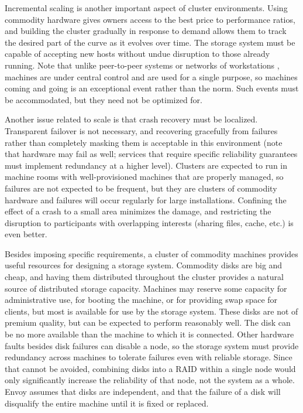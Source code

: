 Incremental scaling is another important aspect of cluster environments. Using commodity hardware gives owners access to the best price to performance ratios, and building the cluster gradually in response to demand allows them to track the desired part of the curve as it evolves over time. The storage system must be capable of accepting new hosts without undue disruption to those already running. Note that unlike peer-to-peer systems \cite{blake} or networks of workstations \cite{anderson95a}, machines are under central control and are used for a single purpose, so machines coming and going is an exceptional event rather than the norm. Such events must be accommodated, but they need not be optimized for.

Another issue related to scale is that crash recovery must be localized. Transparent failover is not necessary, and recovering gracefully from failures rather than completely masking them \cite{baker94} is acceptable in this environment (note that hardware may fail as well; services that require specific reliability guarantees must implement redundancy at a higher level). Clusters are expected to run in machine rooms with well-provisioned machines that are properly managed, so failures are not expected to be frequent, but they are clusters of commodity hardware and failures will occur regularly for large installations. Confining the effect of a crash to a small area minimizes the damage, and restricting the disruption to participants with overlapping interests (sharing files, cache, etc.) is even better.

Besides imposing specific requirements, a cluster of commodity machines provides useful resources for designing a storage system. Commodity disks are big and cheap, and having them distributed throughout the cluster provides a natural source of distributed storage capacity. Machines may reserve some capacity for administrative use, for booting the machine, or for providing swap space for clients, but most is available for use by the storage system. These disks are not of premium quality, but can be expected to perform reasonably well. The disk can be no more available than the machine to which it is connected. Other hardware faults besides disk failures can disable a node, so the storage system must provide redundancy across machines to tolerate failures even with reliable storage. Since that cannot be avoided, combining disks into a RAID within a single node would only significantly increase the reliability of that node, not the system as a whole. Envoy assumes that disks are independent, and that the failure of a disk will disqualify the entire machine until it is fixed or replaced.


